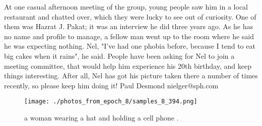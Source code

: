 \documentclass{article}%
\begin{document}
At one casual afternoon meeting of the group, young people saw him in a local restaurant and chatted over, which they were lucky to see out of curiosity. One of them was Hazrat J. Pakat; it was an interview he did three years ago.\newline%
As he has no name and profile to manage, a fellow man went up to the room where he said he was expecting nothing. Nel, "I've had one phobia before, because I tend to eat big cakes when it rains", he said.\newline%
People have been asking for Nel to join a meeting committee, that would help him experience his 20th birthday, and keep things interesting. After all, Nel has got his picture taken there a number of times recently, so please keep him doing it!\newline%
Paul Desmond\newline%
nielger@sph.com\newline%

%


\begin{figure}[h!]%
\centering%
\texttt{[image: ./photos\_from\_epoch\_8/samples\_8\_394.png]}%
\caption{a woman wearing a hat and holding a cell phone .}%
\end{figure}

%
\end{document}
